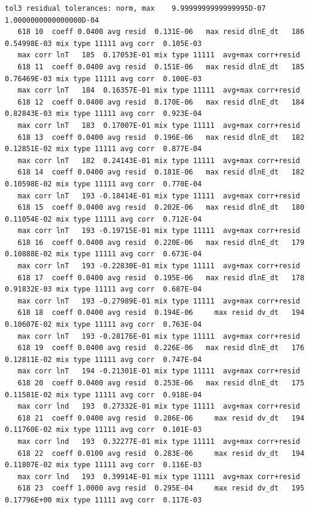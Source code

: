 \documentclass[a4paper,10pt]{article}
\begin{document}
\begin{verbatim}
tol3 residual tolerances: norm, max    9.9999999999999995D-07    1.0000000000000000D-04
   618 10  coeff 0.0400 avg resid  0.131E-06   max resid dlnE_dt   186  0.54998E-03 mix type 11111 avg corr  0.105E-03
   max corr lnT   185  0.17053E-01 mix type 11111  avg+max corr+resid
   618 11  coeff 0.0400 avg resid  0.151E-06   max resid dlnE_dt   185  0.76469E-03 mix type 11111 avg corr  0.100E-03
   max corr lnT   184  0.16357E-01 mix type 11111  avg+max corr+resid
   618 12  coeff 0.0400 avg resid  0.170E-06   max resid dlnE_dt   184  0.82843E-03 mix type 11111 avg corr  0.923E-04
   max corr lnT   183  0.17007E-01 mix type 11111  avg+max corr+resid
   618 13  coeff 0.0400 avg resid  0.196E-06   max resid dlnE_dt   182  0.12851E-02 mix type 11111 avg corr  0.877E-04
   max corr lnT   182  0.24143E-01 mix type 11111  avg+max corr+resid
   618 14  coeff 0.0400 avg resid  0.181E-06   max resid dlnE_dt   182  0.10598E-02 mix type 11111 avg corr  0.770E-04
   max corr lnT   193 -0.18414E-01 mix type 11111  avg+max corr+resid
   618 15  coeff 0.0400 avg resid  0.202E-06   max resid dlnE_dt   180  0.11054E-02 mix type 11111 avg corr  0.712E-04
   max corr lnT   193 -0.19715E-01 mix type 11111  avg+max corr+resid
   618 16  coeff 0.0400 avg resid  0.220E-06   max resid dlnE_dt   179  0.10888E-02 mix type 11111 avg corr  0.673E-04
   max corr lnT   193 -0.22830E-01 mix type 11111  avg+max corr+resid
   618 17  coeff 0.0400 avg resid  0.195E-06   max resid dlnE_dt   178  0.91832E-03 mix type 11111 avg corr  0.687E-04
   max corr lnT   193 -0.27989E-01 mix type 11111  avg+max corr+resid
   618 18  coeff 0.0400 avg resid  0.194E-06     max resid dv_dt   194  0.10607E-02 mix type 11111 avg corr  0.763E-04
   max corr lnT   193 -0.28176E-01 mix type 11111  avg+max corr+resid
   618 19  coeff 0.0400 avg resid  0.226E-06   max resid dlnE_dt   176  0.12811E-02 mix type 11111 avg corr  0.747E-04
   max corr lnT   194 -0.21301E-01 mix type 11111  avg+max corr+resid
   618 20  coeff 0.0400 avg resid  0.253E-06   max resid dlnE_dt   175  0.11581E-02 mix type 11111 avg corr  0.918E-04
   max corr lnd   193  0.27332E-01 mix type 11111  avg+max corr+resid
   618 21  coeff 0.0400 avg resid  0.286E-06     max resid dv_dt   194  0.11760E-02 mix type 11111 avg corr  0.101E-03
   max corr lnd   193  0.32277E-01 mix type 11111  avg+max corr+resid
   618 22  coeff 0.0100 avg resid  0.283E-06     max resid dv_dt   194  0.11807E-02 mix type 11111 avg corr  0.116E-03
   max corr lnd   193  0.39914E-01 mix type 11111  avg+max corr+resid
   618 23  coeff 1.0000 avg resid  0.295E-04     max resid dv_dt   195  0.17796E+00 mix type 11111 avg corr  0.117E-03

\end{verbatim}
\end{document}
